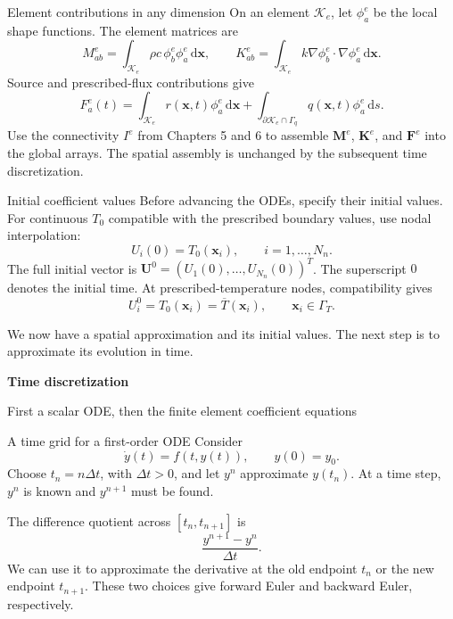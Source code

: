 \documentclass[11pt,aspectratio=169]{beamer}
\newcommand{\dd}{\mathrm d}
\newcommand{\bU}{\bm U}
\newcommand{\bx}{\bm x}
\newcommand{\bM}{\bm M}
\newcommand{\bK}{\bm K}
\newcommand{\bF}{\bm F}
\begin{document}
\begin{frame}{Element contributions in any dimension}
On an element $\mathcal K_e$, let $\phi_a^e$ be the local shape functions.
The element matrices are
\[
M^e_{ab}=\int_{\mathcal K_e}\rho c\,\phi_b^e\phi_a^e\,\dd\bx,
\qquad K^e_{ab}=\int_{\mathcal K_e}k\nabla\phi_b^e\cdot\nabla\phi_a^e\,\dd\bx.
\]
Source and prescribed-flux contributions give
\[
F_a^e(t)=\int_{\mathcal K_e}r(\bx,t)\phi_a^e\,\dd\bx
+\int_{\partial\mathcal K_e\cap\Gamma_q}q(\bx,t)\phi_a^e\,\dd s.
\]
Use the connectivity $I^e$ from Chapters 5 and 6 to assemble
$\bM^e$, $\bK^e$, and $\bF^e$ into the global arrays.
The spatial assembly is unchanged by the subsequent time discretization.
\end{frame}

\begin{frame}{Initial coefficient values}
Before advancing the ODEs, specify their initial values.
For continuous $T_0$ compatible with the prescribed boundary values, use nodal interpolation:
\[
U_i(0)=T_0(\bx_i),\qquad i=1,\ldots,N_n.
\]
The full initial vector is $\bU^0=(U_1(0),\ldots,U_{N_n}(0))^T$.
The superscript $0$ denotes the initial time.
At prescribed-temperature nodes, compatibility gives
\[
U_i^0=T_0(\bx_i)=\overline T(\bx_i),\qquad \bx_i\in\Gamma_T.
\]
\medskip

We now have a spatial approximation and its initial values.
The next step is to approximate its evolution in time.
\end{frame}

\begin{frame}
\centering\vfill
{\LARGE\bfseries Time discretization\par}
\vspace{0.4cm}
First a scalar ODE, then the finite element coefficient equations
\vfill
\end{frame}

\begin{frame}{A time grid for a first-order ODE}
Consider
\[
\dot y(t)=f(t,y(t)),\qquad y(0)=y_0.
\]
Choose $t_n=n\Delta t$, with $\Delta t>0$, and let
$y^n$ approximate $y(t_n)$.
At a time step, $y^n$ is known and $y^{n+1}$ must be found.
\medskip

The difference quotient across $[t_n,t_{n+1}]$ is
\[
\frac{y^{n+1}-y^n}{\Delta t}.
\]
We can use it to approximate the derivative at the old endpoint $t_n$
or the new endpoint $t_{n+1}$.
These two choices give forward Euler and backward Euler, respectively.
\end{frame}
\end{document}
